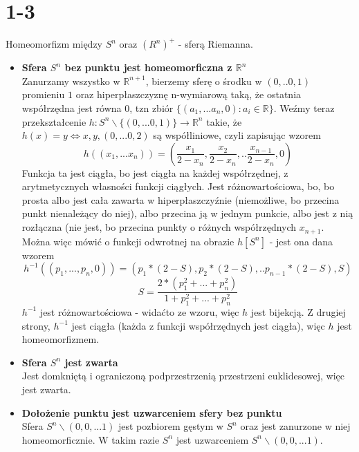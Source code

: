 \section*{1-3}
Homeomorfizm między $S^n$ oraz $ (R^n)^{+} $ - sferą Riemanna.
\begin{itemize}
\item \textbf{Sfera $S^n$ bez punktu jest homeomorficzna z $\mathbb{R}^n$}\\
Zanurzamy wszystko w $\mathbb{R}^{n+1}$, bierzemy sferę o środku w $(0, .. 0, 1)$ promieniu $1$ oraz hiperpłaszczyznę n-wymiarową taką, że ostatnia współrzędna jest równa $0$, tzn zbiór $\{(a_1, ... a_n, 0): a_i \in \mathbb{R}\}$.
Weźmy teraz przekształcenie $h: S^n \backslash \{(0, ... 0, 1)\} \rightarrow \mathbb{R}^n$ takie, że $h(x) = y \iff x, y, (0, ... 0, 2)$ są współliniowe, czyli zapisując wzorem
$$
h((x_1, ... x_n)) = (\frac{x_1}{2-x_n}, \frac{x_2}{2-x_n}, .. \frac{x_{n-1}}{2-x_n}, 0)
$$
Funkcja ta jest ciągła, bo jest ciągła na każdej współrzędnej, z arytmetycznych własności funkcji ciągłych.
Jest różnowartościowa, bo, bo prosta albo jest cała zawarta w hiperpłaszczyźnie (niemożliwe, bo przecina punkt nienależący do niej), albo przecina ją w jednym punkcie, albo jest z nią rozłączna (nie jest, bo przecina punkty o różnych współrzędnych $x_{n+1}$. 
Można więc mówić o funkcji odwrotnej na obrazie $h[S^n]$ - jest ona dana wzorem
$$
h^{-1}((p_1, ... , p_n, 0)) = (p_1 * (2-S), p_2*(2-S), .. p_{n-1} * (2-S), S)
$$
$$
S = \frac{2*(p_1^2 + ... + p_n^2)}{1 + p_1^2 + ... + p_n^2}
$$
$h^{-1}$ jest różnowartościowa - widaćto ze wzoru, więc $h$ jest bijekcją. 
Z drugiej strony, $h^{-1}$ jest ciągła (każda z funkcji współrzędnych jest ciągła), więc $h$ jest homeomorfizmem.

\item \textbf{Sfera $S^n$ jest zwarta}\\
Jest domkniętą i ograniczoną podprzestrzenią przestrzeni euklidesowej, więc jest zwarta.

\item \textbf{Dołożenie punktu jest uzwarceniem sfery bez punktu}\\
Sfera $S^n \backslash (0, 0, ... 1)$ jest pozbiorem gęstym w $S^n$ oraz jest zanurzone w niej homeomorficznie. W takim razie $S^n$ jest uzwarceniem $S^n \backslash (0, 0, ... 1)$.


\end{itemize}
